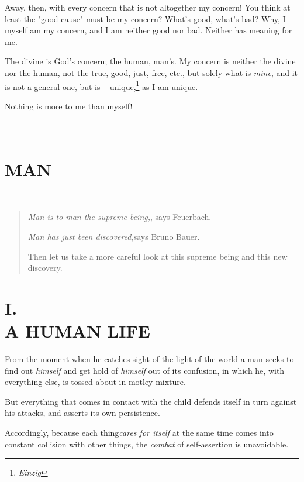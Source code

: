 \documentclass[a4paper]{book}
\begin{document}
Away, then, with every concern that is not altogether my concern! You think at 
least the "{}good cause"{} must be my concern? What's good, what's bad? Why, I 
myself am my concern, and I am neither good nor bad. Neither has meaning for 
me.

The divine is God's concern; the human, man's. My concern is neither the 
divine nor the human, not the true, good, just, free, etc., but solely what is 
\textit{mine}, and it is not a general one, but is -- 
unique,\footnote{\textit{Einzig}} as I am unique.

Nothing is more to me than myself!


\chapter[Part First: Man]{\\
MAN}

\newpage{}

~

\vspace{200pt}

\begin{quote}

\textit{Man is to man the supreme being,}, says Feuerbach.

\textit{Man has just been discovered,}says Bruno Bauer.

Then let us take a more careful look at this supreme being and this new 
discovery.

\end{quote}

\medskip{}

\chapter[I. A Human Life]{\centering I.\\
A HUMAN LIFE}

From the moment when he catches sight of the light of the world a man seeks to 
find out \textit{himself} and get hold of \textit{himself} out of its 
confusion, in which he, with everything else, is tossed about in motley 
mixture.

But everything that comes in contact with the child defends itself in turn 
against his attacks, and asserts its own persistence.

Accordingly, because each thing\textit{cares for itself} at the same time 
comes into constant collision with other things, the \textit{combat} of 
self-assertion is unavoidable.
\end{document}
